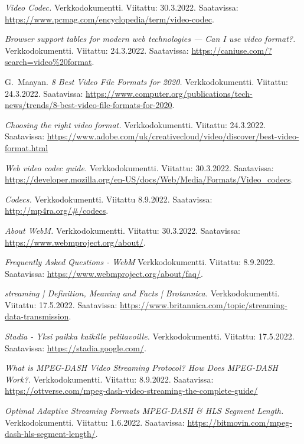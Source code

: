 \documentclass[finnish, 12pt, a4paper, elec, utf8, a-1b, online]{aaltothesis}
\begin{document}
\begin{thebibliography}{99}
    \textit{Video Codec.}
    Verkkodokumentti.
    Viitattu: 30.3.2022.
    Saatavissa: \url{https://www.pcmag.com/encyclopedia/term/video-codec}.

    \textit{Browser support tables for modern web technologies — Can I use video format?.}
    Verkkodokumentti.
    Viitattu: 24.3.2022.
    Saatavissa: \url{https://caniuse.com/?search=video%20format}.

    G.\ Maayan.
    \textit{8 Best Video File Formats for 2020.}
    Verkkodokumentti.
    Viitattu: 24.3.2022.
    Saatavissa: \url{https://www.computer.org/publications/tech-news/trends/8-best-video-file-formats-for-2020}.

    \textit{Choosing the right video format.}
    Verkkodokumentti.
    Viitattu: 24.3.2022.
    Saatavissa: \url{https://www.adobe.com/uk/creativecloud/video/discover/best-video-format.html}

    \textit{Web video codec guide.}
    Verkkodokumentti.
    Viitattu: 30.3.2022.
    Saatavissa: \url{https://developer.mozilla.org/en-US/docs/Web/Media/Formats/Video_codecs}.

    \textit{Codecs.}
    Verkkodokumentti.
    Viitattu 8.9.2022.
    Saatavissa: \url{http://mp4ra.org/#/codecs}.

    \textit{About WebM.}
    Verkkodokumentti.
    Viitattu: 30.3.2022.
    Saatavissa: \url{https://www.webmproject.org/about/}.

    \textit{Frequently Asked Questions - WebM}
    Verkkodokumentti.
    Viitattu: 8.9.2022.
    Saatavissa: \url{https://www.webmproject.org/about/faq/}.

    \textit{streaming | Definition, Meaning and Facts | Brotannica.}
    Verkkodokumentti.
    Viitattu: 17.5.2022.
    Saatavissa: \url{https://www.britannica.com/topic/streaming-data-transmission}.

    \textit{Stadia - Yksi paikka kaikille pelitavoille.}
    Verkkodokumentti.
    Viitattu: 17.5.2022.
    Saatavissa: \url{https://stadia.google.com/}.

    \textit{What is MPEG-DASH Video Streaming Protocol? How Does MPEG-DASH Work?.}
    Verkkodokumentti.
    Viitattu: 8.9.2022.
    Saatavissa: \url{https://ottverse.com/mpeg-dash-video-streaming-the-complete-guide/}

    \textit{Optimal Adaptive Streaming Formats MPEG-DASH & HLS Segment Length.}
    Verkkodokumentti.
    Viitattu: 1.6.2022.
    Saatavissa: \url{https://bitmovin.com/mpeg-dash-hls-segment-length/}.


\end{thebibliography}
\end{document}

